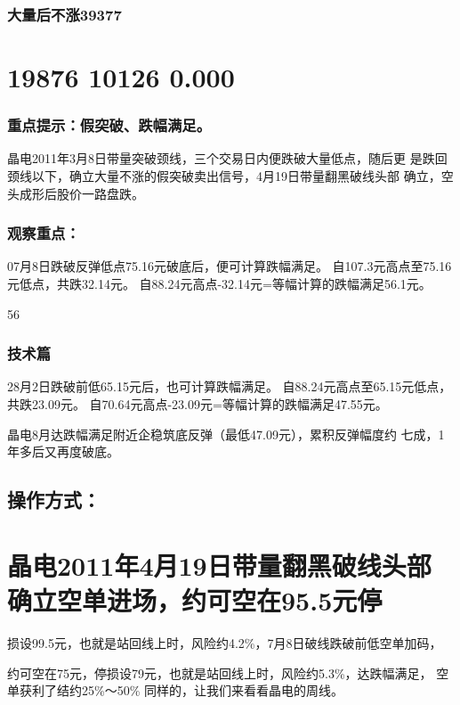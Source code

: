 \documentclass{article}
\begin{document}
\subsubsection{大量后不涨39377}

\section{19876 10126 0.000}

\subsubsection{重点提示：假突破、跌幅满足。}

晶电2011年3月8日带量突破颈线，三个交易日内便跌破大量低点，随后更 是跌回颈线以下，确立大量不涨的假突破卖出信号，4月19日带量翻黑破线头部 确立，空头成形后股价一路盘跌。

\subsubsection{观察重点：}

07月8日跌破反弹低点75.16元破底后，便可计算跌幅满足。 自107.3元高点至75.16元低点，共跌32.14元。 自88.24元高点-32.14元=等幅计算的跌幅满足56.1元。

56

\clearpage

\subsubsection{技术篇}

28月2日跌破前低65.15元后，也可计算跌幅满足。 自88.24元高点至65.15元低点，共跌23.09元。 自70.64元高点-23.09元=等幅计算的跌幅满足47.55元。

晶电8月达跌幅满足附近企稳筑底反弹（最低47.09元），累积反弹幅度约 七成，1年多后又再度破底。

\subsection{操作方式：}

\section{晶电2011年4月19日带量翻黑破线头部确立空单进场，约可空在95.5元停}

损设99.5元，也就是站回线上时，风险约4.2\%，7月8日破线跌破前低空单加码，

约可空在75元，停损设79元，也就是站回线上时，风险约5.3\%，达跌幅满足， 空单获利了结约25\%～50\% 同样的，让我们来看看晶电的周线。
\end{document}
